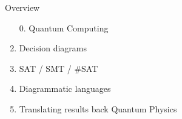 \begin{frame}[noframenumbering]{Overview}


		\begin{enumerate}
			\item[0.] Quantum Computing
			\item Decision diagrams
			\item SAT / SMT / \#SAT
			\item Diagrammatic languages
			\item Translating results back Quantum Physics
		\end{enumerate}
\end{frame}


%
%
%
%
%
%
%
%
%
%
%
%
%
%	



